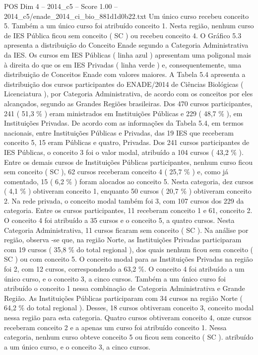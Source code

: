 \begin{textsample}{POS Dim 4 – 2014\_c5 – Score 1.00 – 2014\_c5/enade\_2014\_ci\_bio\_881d1d0b22.txt}
Um único curso recebeu conceito 5.
Também a um único curso foi atribuído conceito 1.
Nesta região, nenhum curso de IES Pública ficou sem conceito ( SC ) ou recebeu conceito 4.
O Gráfico 5.3 apresenta a distribuição do Conceito Enade segundo a Categoria Administrativa da IES.
Os cursos em IES Públicas ( linha azul ) apresentam uma poligonal mais à direita do que os em IES Privadas ( linha verde ) e, consequentemente, uma distribuição de Conceitos Enade com valores maiores.
A Tabela 5.4 apresenta a distribuição dos cursos participantes do ENADE/2014 de Ciências Biológicas ( Licenciatura ), por Categoria Administrativa, de acordo com os conceitos por eles alcançados, segundo as Grandes Regiões brasileiras.
Dos 470 cursos participantes, 241 ( 51,3 \% ) eram ministrados em Instituições Públicas e 229 ( 48,7 \% ), em Instituições Privadas.
De acordo com as informações da Tabela 5.4, em termos nacionais, entre Instituições Públicas e Privadas, das 19 IES que receberam conceito 5, 15 eram Públicas e quatro, Privadas.
Dos 241 cursos participantes de IES Públicas, o conceito 3 foi o valor modal, atribuído a 104 cursos ( 43,2 \% ).
Entre os demais cursos de Instituições Públicas participantes, nenhum curso ficou sem conceito ( SC ), 62 cursos receberam conceito 4 ( 25,7 \% ) e, como já comentado, 15 ( 6,2 \% ) foram alocados ao conceito 5.
Nesta categoria, dez cursos ( 4,1 \% ) obtiveram conceito 1, enquanto 50 cursos ( 20,7 \% ) obtiveram conceito 2.
Na rede privada, o conceito modal também foi 3, com 107 cursos dos 229 da categoria.
Entre os cursos participantes, 11 receberam conceito 1 e 61, conceito 2.
O conceito 4 foi atribuído a 35 cursos e o conceito 5, a quatro cursos.
Nesta Categoria Administrativa, 11 cursos ficaram sem conceito ( SC ).
Na análise por região, observa -se que, na região Norte, as Instituições Privadas participaram com 19 cursos ( 35,8 \% do total regional ), dos quais nenhum ficou sem conceito ( SC ) ou com conceito 5.
O conceito modal para as Instituições Privadas na região foi 2, com 12 cursos, correspondendo a 63,2 \%.
O conceito 4 foi atribuído a um único curso, e o conceito 3, a cinco cursos.
Também a um único curso foi atribuído o conceito 1 nessa combinação de Categoria Administrativa e Grande Região.
As Instituições Públicas participaram com 34 cursos na região Norte ( 64,2 \% do total regional ).
Desses, 18 cursos obtiveram conceito 3, conceito modal nessa região para esta categoria.
Quatro cursos obtiveram conceito 4, onze cursos receberam conceito 2 e a apenas um curso foi atribuído conceito 1.
Nessa categoria, nenhum curso obteve conceito 5 ou ficou sem conceito ( SC ). atribuído a um único curso, e o conceito 3, a cinco cursos.

\end{textsample}
